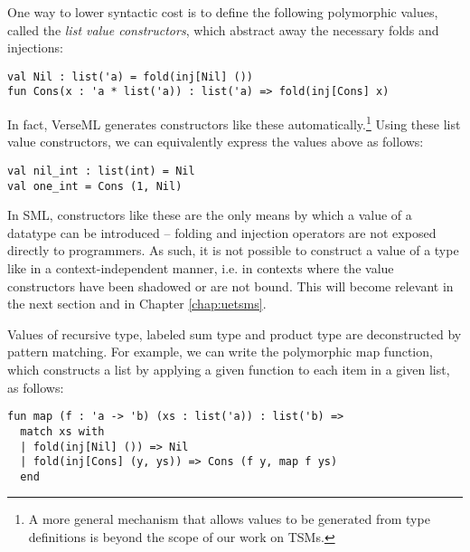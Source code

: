 One way to lower syntactic cost is to define the following polymorphic values, called the \emph{list value constructors}, which abstract away the necessary folds and injections:
\begin{lstlisting}[numbers=none]
val Nil : list('a) = fold(inj[Nil] ())
fun Cons(x : 'a * list('a)) : list('a) => fold(inj[Cons] x)
\end{lstlisting}
In fact, VerseML generates constructors like these automatically.\footnote{A more general mechanism that allows values to be generated from type definitions is beyond the scope of our work on TSMs.} 
Using these list value constructors, we can equivalently express the values above as follows:
\begin{lstlisting}[numbers=none]
val nil_int : list(int) = Nil
val one_int = Cons (1, Nil)
\end{lstlisting}
In SML, constructors like these are the only means by which a value of a datatype can be introduced -- folding and injection operators are not exposed directly to programmers. As such, it is not possible to construct a value of a type like  in a context-independent manner, i.e. in contexts where the value constructors have been shadowed or are not bound. This will become relevant in the next section and in Chapter \ref{chap:uetsms}. %

Values of recursive type, labeled sum type and product type are deconstructed by pattern matching. %
For example, we can write the polymorphic map function, which constructs a  list by applying a given function to each item in a given list, as follows:
\begin{lstlisting}[numbers=none]
fun map (f : 'a -> 'b) (xs : list('a)) : list('b) => 
  match xs with 
  | fold(inj[Nil] ()) => Nil
  | fold(inj[Cons] (y, ys)) => Cons (f y, map f ys)
  end
\end{lstlisting}


